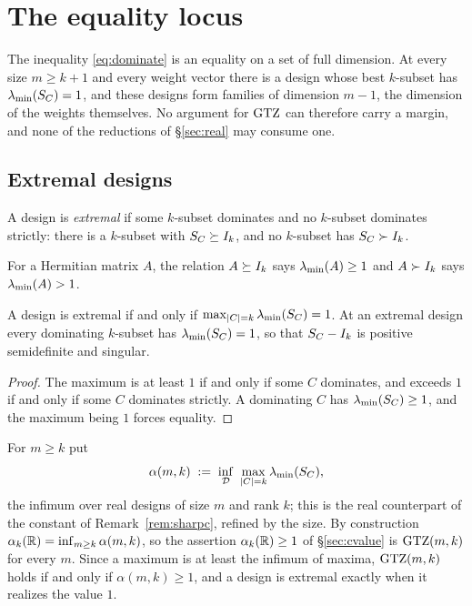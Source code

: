 \section{The equality locus}\label{sec:ties}

The inequality \eqref{eq:dominate} is an equality on a set of full
dimension.  At every size $m\ge k+1$ and every weight vector there is a
design whose best $k$-subset has $\lambda_{\min}(S_{C})=1$, and these designs form
families of dimension $m-1$, the dimension of the weights themselves.  No
argument for $\mathrm{GTZ}$ can therefore carry a margin, and none of the
reductions of \S\ref{sec:real} may consume one.

\subsection{Extremal designs}\label{sec:extremal}

\begin{definition}\label{def:tie}
A design is \emph{extremal} if some $k$-subset dominates and no $k$-subset
dominates strictly: there is a $k$-subset with $S_{C}\succeq I_k$, and no
$k$-subset has $S_{C}\succ I_k$.
\end{definition}

For a Hermitian matrix $A$, the relation $A\succeq I_k$ says
$\lambda_{\min}(A)\ge1$ and $A\succ I_k$ says $\lambda_{\min}(A)>1$.

\begin{lemma}\label{lem:tiemax}
A design is extremal if and only if
$\max_{\lvert C\rvert=k}\lambda_{\min}(S_{C})=1$.  At an extremal design every
dominating $k$-subset has $\lambda_{\min}(S_{C})=1$, so that $S_{C}-I_k$ is
positive semidefinite and singular.
\end{lemma}

\begin{proof}
The maximum is at least $1$ if and only if some $C$ dominates, and exceeds
$1$ if and only if some $C$ dominates strictly.  A dominating $C$ has
$\lambda_{\min}(S_{C})\ge1$, and the maximum being $1$ forces equality.
\end{proof}

For $m\ge k$ put
\begin{equation}\label{eq:alpha}
  \alpha(m,k)\;:=\;\inf_{\mathcal{D}}\ \max_{\lvert C\rvert=k}\lambda_{\min}(S_{C}),
\end{equation}
the infimum over real designs of size $m$ and rank $k$; this is the real
counterpart of the constant of Remark~\ref{rem:sharpc}, refined by the
size.  By construction $\alpha_k(\mathbb{R})=\inf_{m\ge k}\alpha(m,k)$, so the
assertion $\alpha_k(\mathbb{R})\ge1$ of \S\ref{sec:cvalue} is $\mathrm{GTZ}(m,k)$ for
every $m$.  Since a maximum is at least the infimum of maxima,
$\mathrm{GTZ}(m,k)$ holds if and only if $\alpha(m,k)\ge1$, and a design is
extremal exactly when it realizes the value $1$.

